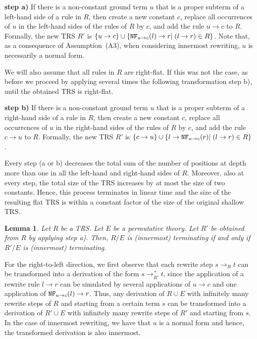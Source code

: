 \documentclass{LMCS}
\theoremstyle{plain}
\newtheorem{lemma}[thm]{Lemma}
\begin{document}
\medskip

\noindent
{\bf step a)} If there is a non-constant ground term $u$ that is
a proper subterm of a left-hand side of a rule in $R$, then create
a new constant $c$, replace all occurrences of $u$ in
the left-hand sides of the rules of $R$ by $c$, and add the
rule $u\rightarrow c$ to $R$. Formally,
the new TRS $R'$ is
$\{u\to c\}\cup\{{\tt NF}_{u\to c}(l)\to r|\;(l\to r)\in R\}$.
Note that, as a consequence of Assumption~(A3),
when considering innermost rewriting, $u$ is
necessarily a normal form.

\medskip

We will also assume that all rules in $R$ are right-flat.
If this was not the case, as before
we proceed by applying several times the following
transformation step b), until the obtained TRS is right-flat.


\medskip

\noindent
{\bf step b)} If there is a non-constant ground term $u$ that is a proper
subterm of a right-hand side of a rule in $R$, then create
a new constant $c$, replace all occurrences of $u$ in
the right-hand sides of the rules of $R$ by $c$, and add the
rule $c\rightarrow u$ to $R$. Formally,
the new TRS $R'$ is
$\{c\to u\}\cup\{l\to{\tt NF}_{u\to c}(r)|\;(l\to r)\in R\}$.

\medskip

Every step (a or b) decreases the total sum of the number of positions at
depth more than one in all the left-hand and right-hand sides of $R$.
Moreover, also at every step, the total size of the TRS
increases by at most the size of two constants.
Hence, this process terminates in linear time and the size of
the resulting flat TRS is within a constant factor of the size of
the original shallow TRS.



\begin{lemma}\label{lemma-simplifying2}
Let $R$ be a TRS. Let $E$ be a permutative theory.
Let $R'$ be obtained from $R$ by applying step a).
Then, $R/E$ is (innermost) terminating if and only if
$R'/E$ is (innermost) terminating.
\end{lemma}
\proof
For the right-to-left direction, we first observe
that each rewrite step $s\to_Rt$ can be transformed
into a derivation of the form $s\to_{R'}^+t$,
since the application of a rewrite rule $l\to r$
can be simulated by several applications of $u\to c$
and one application of ${\tt NF}_{u\to c}(l)\to r$.
Thus, any derivation of $R\cup E$ with infinitely many
rewrite steps of $R$ and starting from a certain term $s$
can be transformed into a derivation of $R'\cup E$
with infinitely many rewrite steps of $R'$ and starting from $s$.
In the case of innermost rewriting,
we have that $u$ is a normal form and hence, 
the transformed derivation is also innermost.
\end{document}
